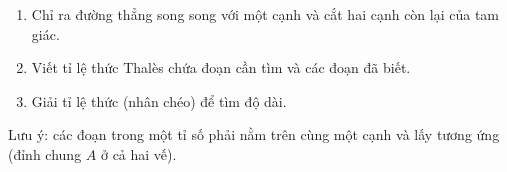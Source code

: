 \begin{enumerate}
\item Chỉ ra đường thẳng song song với một cạnh và cắt hai cạnh còn lại của tam giác.
\item Viết tỉ lệ thức Thalès chứa đoạn cần tìm và các đoạn đã biết.
\item Giải tỉ lệ thức (nhân chéo) để tìm độ dài.
\end{enumerate}
Lưu ý: các đoạn trong một tỉ số phải nằm trên cùng một cạnh và lấy tương ứng (đỉnh chung $A$ ở cả hai vế).
